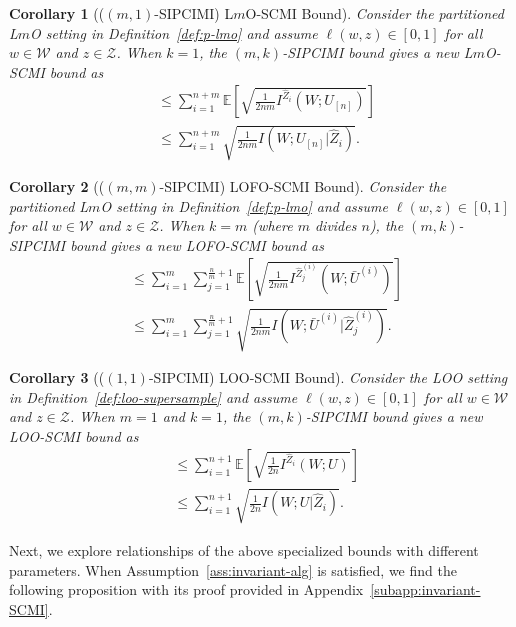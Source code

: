\documentclass[onecolumn,romanappendices,10pt]{IEEEtran}
\newtheorem{corollary}{Corollary}
\newcommand{\Wcal}{{\mathcal W}}
\newcommand{\Zcal}{{\mathcal Z}}
\newcommand{\EE}{{\mathbb{E}}}
\DeclareMathOperator{\gen}{\overline{gen}}
\begin{document}
	\begin{corollary}[($(m, 1)$-SIPCIMI) L$m$O-SCMI Bound]\label{cor:lmo-SCMI}
		Consider the partitioned L$m$O setting in Definition~\ref{def:p-lmo} and assume $\ell(w, z) \in [0, 1]$ for all $w \in \Wcal$ and $z \in \Zcal$. When $k = 1$, the $(m, k)$-SIPCIMI bound gives a new L$m$O-SCMI bound as
		\begin{align}
			\gen &\leq \sum_{i=1}^{n+m} \EE \left[ \sqrt{ \frac{1}{2nm} I^{\hat{Z}_i}\left( W; U_{[n]} \right)} \right] \label{eq:dis-lmo-SCMI}\\
			&\leq \sum_{i=1}^{n+m} \sqrt{ \frac{1}{2nm} I\left( W; U_{[n]} | \hat{Z}_i \right)}.
			\label{eq:lmo-SCMI}
		\end{align}
	\end{corollary}
	
	\begin{corollary}[($(m, m)$-SIPCIMI) LOFO-SCMI Bound]
		Consider the partitioned L$m$O setting in Definition~\ref{def:p-lmo} and assume $\ell(w, z) \in [0, 1]$ for all $w \in \Wcal$ and $z \in \Zcal$. When $k = m$ (where $m$ divides $n$), the $(m, k)$-SIPCIMI bound gives a new LOFO-SCMI bound as
		\begin{align}
			\gen &\leq \sum_{i=1}^{m} \sum_{j=1}^{\frac{n}{m}+1} \EE \left[ \sqrt{ \frac{1}{2nm} I^{\hat{Z}^{(i)}_j}\left( W; \bar{U}^{(i)} \right)} \right] \label{eq:dis-lofo-SCMI} \\
			&\leq \sum_{i=1}^{m} \sum_{j=1}^{\frac{n}{m}+1} \sqrt{ \frac{1}{2nm} I\left( W; \bar{U}^{(i)} | \hat{Z}^{(i)}_j \right)}.
			\label{eq:lofo-SCMI}
		\end{align}
	\end{corollary}
	
	\begin{corollary}[($(1, 1)$-SIPCIMI) LOO-SCMI Bound]
		Consider the LOO setting in Definition~\ref{def:loo-supersample} and assume $\ell(w, z) \in [0, 1]$ for all $w \in \Wcal$ and $z \in \Zcal$. When $m = 1$ and $k = 1$, the $(m, k)$-SIPCIMI bound gives a new LOO-SCMI bound as
		\begin{align}
			\gen &\leq \sum_{i=1}^{n+1} \EE \left[ \sqrt{ \frac{1}{2n} I^{\hat{Z}_i}\left( W; U \right)} \right]	\label{eq:dis-loo-SCMI} \\
			&\leq \sum_{i=1}^{n+1} \sqrt{ \frac{1}{2n} I\left( W; U | \hat{Z}_i \right)}.
			\label{eq:loo-SCMI}
		\end{align}
	\end{corollary}
	
	Next, we explore relationships of the above specialized bounds with different parameters. When Assumption~\ref{ass:invariant-alg} is satisfied, we find the following proposition with its proof provided in Appendix~\ref{subapp:invariant-SCMI}.
	
\end{document}

